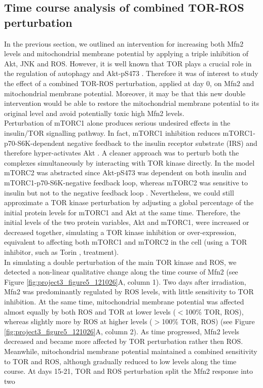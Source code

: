 \subsection{Time course analysis of combined TOR-ROS perturbation}
\label{project3-subsec:Time course analysis of combined TOR-ROS perturbation}
In the previous section, we outlined an intervention for increasing both Mfn2 levels and mitochondrial membrane potential by applying a triple inhibition of Akt, JNK and ROS. However, it is well known that TOR plays a crucial role in the regulation of autophagy \citep{Lee2010,Kim2011} and Akt-pS473 \citep{Sarbassov2005, Sarbassov2006}. Therefore it was of interest to study the effect of a combined TOR-ROS perturbation, applied at day 0, on Mfn2 and mitochondrial membrane potential. Moreover, it may be that this new double intervention would be able to restore the mitochondrial membrane potential to its original level and avoid potentially toxic high Mfn2 levels.\\
Perturbation of mTORC1 alone produces serious undesired effects in the insulin/TOR signalling pathway. In fact, mTORC1 inhibition reduces mTORC1-p70-S6K-dependent negative feedback to the insulin receptor substrate (IRS) and therefore hyper-activates Akt \citep{Harrington2004, Shah2004}. A cleaner approach was to perturb both the complexes simultaneously by interacting with TOR kinase directly. In the model mTORC2 was abstracted since Akt-pS473 was dependent on both insulin and mTORC1-p70-S6K-negative feedback loop, whereas mTORC2 was sensitive to insulin but not to the negative feedback loop \citep{DallePezze2012a}. Nevertheless, we could still approximate a TOR kinase perturbation by adjusting a global percentage of the initial protein levels for mTORC1 and Akt at the same time. Therefore, the initial levels of the two protein variables, Akt and mTORC1, were increased or decreased together, simulating a TOR kinase inhibition or over-expression, equivalent to affecting both mTORC1 and mTORC2 in the cell 
(using a TOR inhibitor, such as Torin \citep{Liu2011}, treatment).\\
In simulating a double perturbation of the main TOR kinase and ROS, we detected a non-linear qualitative change along the time course of Mfn2 (see Figure \ref{fig:project3_figure5_121026}A, column 1). Two days after irradiation, Mfn2 was predominantly regulated by ROS levels, with little sensitivity to TOR inhibition. At the same time, mitochondrial membrane potential was affected almost equally by both ROS and TOR at lower levels ($<$100\% TOR, ROS), whereas slightly more by ROS at higher levels ($>$100\% TOR, ROS) (see Figure \ref{fig:project3_figure5_121026}A, column 2). As time progressed, Mfn2 levels decreased and became more affected by TOR perturbation rather then ROS. Meanwhile, mitochondrial membrane potential maintained a combined sensitivity to TOR and ROS, although gradually reduced to low levels along the time course. At days 15-21, TOR and ROS perturbation split the Mfn2 response into two 

